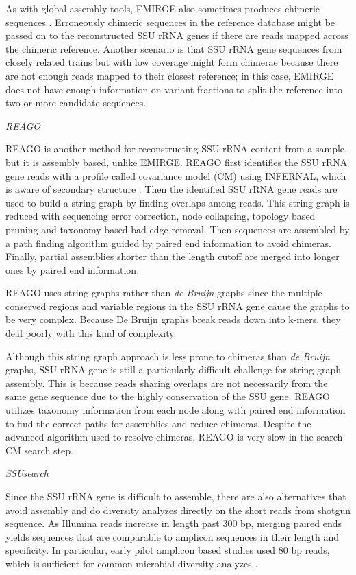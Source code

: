 \documentclass[]{msu-thesis}
\begin{document}
As with global assembly tools, EMIRGE also sometimes produces chimeric
sequences 
\cite{rajeev_dynamic_2013}. Erroneously chimeric sequences in the reference
database might be passed on to the reconstructed SSU rRNA genes if there are
reads mapped across the chimeric reference. Another scenario is that
SSU rRNA gene sequences from closely related trains but with low
coverage might form chimerae because there are not enough reads mapped
to their closest reference; in this case, EMIRGE does not have enough
information on variant fractions to split the reference into two or more
candidate sequences.

\textit{REAGO}

REAGO is another method for reconstructing SSU rRNA content from a sample,
but it is assembly based, unlike EMIRGE.
REAGO first identifies the SSU rRNA gene reads with a profile called
covariance model (CM) using INFERNAL, which is aware of secondary structure
\cite{nawrocki_infernal_2009}. Then the identified SSU rRNA gene
reads are used to build a string graph by finding overlaps among reads.
This string graph is reduced with 
sequencing error correction, node collapsing, topology based pruning
and taxonomy based bad edge removal. Then sequences are assembled by
a path finding algorithm guided by paired end information to avoid
chimeras. Finally, partial assemblies shorter than the length cutoff
are merged into longer ones by paired end information.

REAGO uses string graphs rather than \textit{de Bruijn} graphs since
the multiple conserved regions and variable regions in the SSU rRNA
gene cause the
graphs to be very complex. Because De Bruijn graphs break reads down
into k-mers, they deal poorly with this kind of complexity.

Although this string graph approach is less prone to chimeras than
\textit{de Bruijn} graphs, SSU rRNA gene is still a particularly
difficult challenge for string graph assembly.  This is because reads sharing
overlaps are not necessarily from the same gene sequence
due to the highly conservation of the SSU gene. REAGO utilizes taxonomy
information from each node along with paired end information to find the
correct paths for assemblies and reduec chimeras. Despite the
advanced algorithm used to resolve chimeras, REAGO is very slow in the
search CM search step.

\textit{SSUsearch}

Since the SSU rRNA gene is difficult to assemble, there are also
alternatives that avoid assembly and do diversity analyzes directly on
the short reads from shotgun sequence. As Illumina reads increase in
length past 300 bp, merging paired ends yields sequences that are
comparable to amplicon sequences in their length and specificity.
In particular, early pilot amplicon based studies
used 80 bp reads, which is sufficient for common microbial diversity analyzes
\cite{sogin_microbial_2006}.
\end{document}
